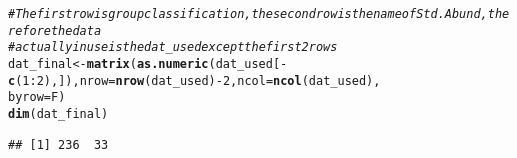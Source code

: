 \documentclass{article}\usepackage[]{graphicx}\usepackage[]{color}
\makeatletter
\newcommand{\hlnum}[1]{\textcolor[rgb]{0.686,0.059,0.569}{#1}}%
\newcommand{\hlcom}[1]{\textcolor[rgb]{0.678,0.584,0.686}{\textit{#1}}}%
\newcommand{\hlopt}[1]{\textcolor[rgb]{0,0,0}{#1}}%
\newcommand{\hlstd}[1]{\textcolor[rgb]{0.345,0.345,0.345}{#1}}%
\newcommand{\hlkwb}[1]{\textcolor[rgb]{0.69,0.353,0.396}{#1}}%
\newcommand{\hlkwc}[1]{\textcolor[rgb]{0.333,0.667,0.333}{#1}}%
\newcommand{\hlkwd}[1]{\textcolor[rgb]{0.737,0.353,0.396}{\textbf{#1}}}%
\newenvironment{kframe}{%
 \def\at@end@of@kframe{}%
 \ifinner\ifhmode%
  \def\at@end@of@kframe{\end{minipage}}%
  \begin{minipage}{\columnwidth}%
 \fi\fi%
 \def\FrameCommand##1{\hskip\@totalleftmargin \hskip-\fboxsep
 \colorbox{shadecolor}{##1}\hskip-\fboxsep
     \hskip-\linewidth \hskip-\@totalleftmargin \hskip\columnwidth}%
 \MakeFramed {\advance\hsize-\width
   \@totalleftmargin\z@ \linewidth\hsize
   \@setminipage}}%
 {\par\unskip\endMakeFramed%
 \at@end@of@kframe}
\newenvironment{knitrout}{}{} %
\makeatother
\begin{document}
\begin{knitrout}
\color{fgcolor}\begin{kframe}
\begin{alltt}
\hlcom{# The first row is group classification, the second row is the name of Std. Abund, therefore the data}
\hlcom{# actually in use is the dat_used except the first 2 rows}
\hlstd{dat_final} \hlkwb{<-} \hlkwd{matrix}\hlstd{(}\hlkwd{as.numeric}\hlstd{(dat_used[}\hlopt{-}\hlkwd{c}\hlstd{(}\hlnum{1}\hlopt{:}\hlnum{2}\hlstd{), ]),} \hlkwc{nrow} \hlstd{=} \hlkwd{nrow}\hlstd{(dat_used)} \hlopt{-} \hlnum{2}\hlstd{,} \hlkwc{ncol} \hlstd{=} \hlkwd{ncol}\hlstd{(dat_used),}
    \hlkwc{byrow} \hlstd{= F)}
\hlkwd{dim}\hlstd{(dat_final)}
\end{alltt}
\begin{verbatim}
## [1] 236  33
\end{verbatim}
\begin{alltt}


\end{alltt}
\end{kframe}
\end{knitrout}
\end{document}
